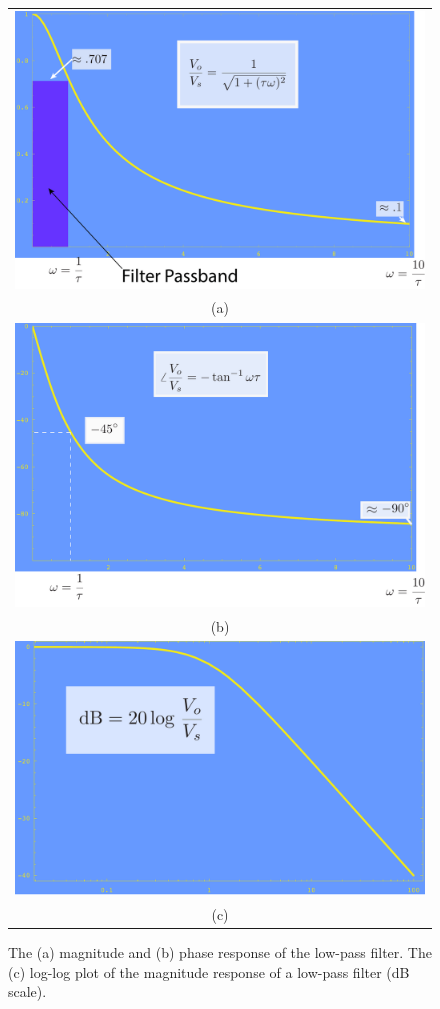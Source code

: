 \begin{figure}[H]
\centering
\begin{tabular}{c}
\includegraphics[width=.65\columnwidth]{mag}\\
(a)\\
\includegraphics[width=.65\columnwidth]{phase}\\
(b)\\
\includegraphics[width=.65\columnwidth]{dB}\\
(c)\\
\end{tabular}
\caption{The (a) magnitude and (b) phase response of the low-pass filter. The (c) log-log plot of the magnitude response of a low-pass filter (dB scale).}
\label{fig:magphase}
\end{figure}
\newpage
